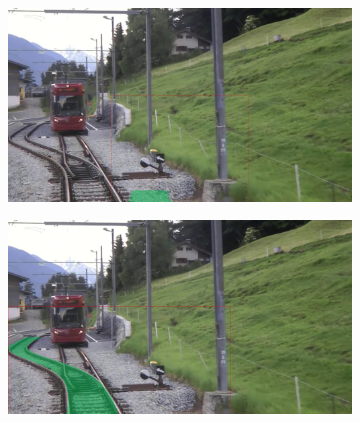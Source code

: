\begin{figure}[H]
\begin{minipage}{0.6\textwidth}
        \begin{subfigure}[b]{0.48\textwidth}
            \centering
            \includegraphics[width=\textwidth]{PICs/experiments/ComparisonBaselineToImproved/original1.jpg}
        \end{subfigure}
        \begin{subfigure}[b]{0.48\textwidth}
            \centering
            \includegraphics[width=\textwidth]{PICs/experiments/ComparisonBaselineToImproved/adapted1.jpg}
        \end{subfigure}
        
        \vspace{0.5cm} %
        

\end{minipage}
\end{figure}
